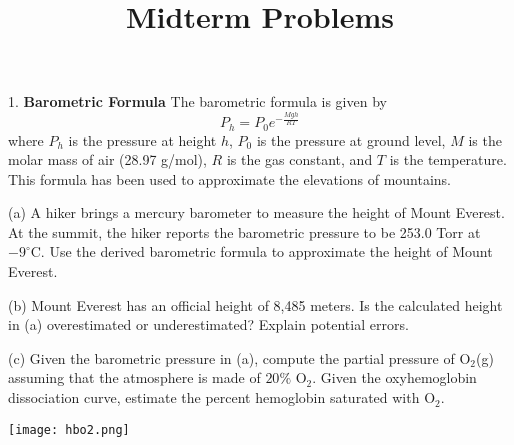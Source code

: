 \documentclass[11pt]{article}
\title{\textbf{Midterm Problems}}
\begin{document}
\maketitle

1. \textbf{Barometric Formula} The barometric formula is given by
\begin{equation*}
  P_h = P_0 e^{-\frac{Mgh}{RT}}
\end{equation*}
where $P_h$ is the pressure at height $h$, $P_0$ is the pressure at ground level,
$M$ is the molar mass of air (28.97 g/mol), $R$ is the gas constant, and $T$ is the
temperature. This formula has been used to approximate the elevations of mountains.

(a) A hiker brings a mercury barometer to measure the height of Mount Everest. At the
summit, the hiker reports the barometric pressure to be 253.0 Torr at $-9^\circ\text{C}$.
Use the derived barometric formula to approximate the height of Mount Everest.

(b) Mount Everest has an official height of 8,485 meters. Is the calculated height in
(a) overestimated or underestimated? Explain potential errors.

(c) Given the barometric pressure in (a), compute the partial pressure of O$_2$(g) assuming
that the atmosphere is made of $20\%$ O$_2$. Given the oxyhemoglobin dissociation curve,
estimate the percent hemoglobin saturated with O$_2$.

\begin{center}
  \texttt{[image: hbo2.png]}
\end{center}

%
%
%
%
%

\pagebreak
\end{document}

